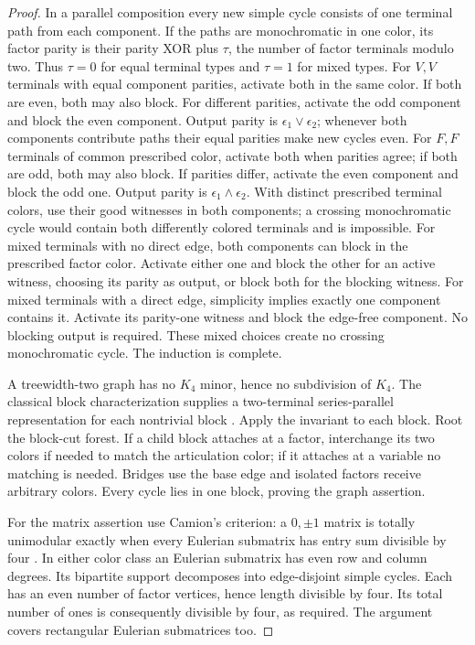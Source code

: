 \begin{proof}
In a parallel composition every new simple cycle consists of one
terminal path from each component. If the paths are monochromatic in
one color, its factor parity is their parity XOR plus $\tau$, the
number of factor terminals modulo two. Thus $\tau=0$ for equal terminal
types and $\tau=1$ for mixed types. For $V,V$ terminals with equal component parities, activate both in the
same color. If both are even, both may also block. For different parities,
activate the odd component and block the even component. Output parity
is $\epsilon_1\lor\epsilon_2$; whenever both components contribute paths
their equal parities make new cycles even.
For $F,F$ terminals of common prescribed color, activate both when
parities agree; if both are odd, both may also block. If parities differ,
activate the even component and block the odd one. Output parity is
$\epsilon_1\land\epsilon_2$. With distinct prescribed terminal colors,
use their good witnesses in both components; a crossing monochromatic
cycle would contain both differently colored terminals and is impossible.
For mixed terminals with no direct edge, both components can block in
the prescribed factor color. Activate either one and block the other
for an active witness, choosing its parity as output, or block both
for the blocking witness. For mixed terminals with a direct edge,
simplicity implies exactly one component contains it. Activate its
parity-one witness and block the edge-free component. No blocking
output is required. These mixed choices create no crossing monochromatic
cycle. The induction is complete.

A treewidth-two graph has no $K_4$ minor, hence no subdivision of $K_4$.
The classical block characterization supplies a two-terminal
series-parallel representation for each nontrivial block
\citep[Theorem 3.1]{HassinTamir1986}. Apply the invariant to each block.
Root the block-cut forest. If a child block attaches at a factor,
interchange its two colors if needed to match the articulation color;
if it attaches at a variable no matching is needed. Bridges use the
base edge and isolated factors receive arbitrary colors. Every cycle
lies in one block, proving the graph assertion.

For the matrix assertion use Camion's criterion: a $0,\pm1$ matrix
is totally unimodular exactly when every Eulerian submatrix has entry
sum divisible by four \citep[Theorem 6.5]{Cornuejols2000}. In either
color class an Eulerian submatrix has even row and column degrees.
Its bipartite support decomposes into edge-disjoint simple cycles.
Each has an even number of factor vertices, hence length divisible
by four. Its total number of ones is consequently divisible by four,
as required. The argument covers rectangular Eulerian submatrices too.
\end{proof}


